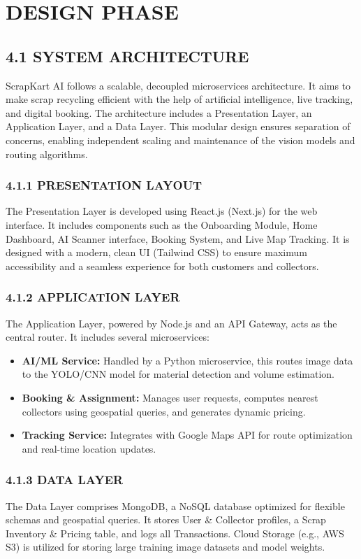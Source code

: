 \chapter{DESIGN PHASE}

\section{4.1 SYSTEM ARCHITECTURE}
ScrapKart AI follows a scalable, decoupled microservices architecture. It aims to make scrap recycling efficient with the help of artificial intelligence, live tracking, and digital booking. The architecture includes a Presentation Layer, an Application Layer, and a Data Layer. This modular design ensures separation of concerns, enabling independent scaling and maintenance of the vision models and routing algorithms.

\subsection{4.1.1 PRESENTATION LAYOUT}
The Presentation Layer is developed using React.js (Next.js) for the web interface. It includes components such as the Onboarding Module, Home Dashboard, AI Scanner interface, Booking System, and Live Map Tracking. It is designed with a modern, clean UI (Tailwind CSS) to ensure maximum accessibility and a seamless experience for both customers and collectors.

\subsection{4.1.2 APPLICATION LAYER}
The Application Layer, powered by Node.js and an API Gateway, acts as the central router. It includes several microservices:
\begin{itemize}
    \item \textbf{AI/ML Service:} Handled by a Python microservice, this routes image data to the YOLO/CNN model for material detection and volume estimation.
    \item \textbf{Booking \& Assignment:} Manages user requests, computes nearest collectors using geospatial queries, and generates dynamic pricing.
    \item \textbf{Tracking Service:} Integrates with Google Maps API for route optimization and real-time location updates.
\end{itemize}

\subsection{4.1.3 DATA LAYER}
The Data Layer comprises MongoDB, a NoSQL database optimized for flexible schemas and geospatial queries. It stores User \& Collector profiles, a Scrap Inventory \& Pricing table, and logs all Transactions. Cloud Storage (e.g., AWS S3) is utilized for storing large training image datasets and model weights.

